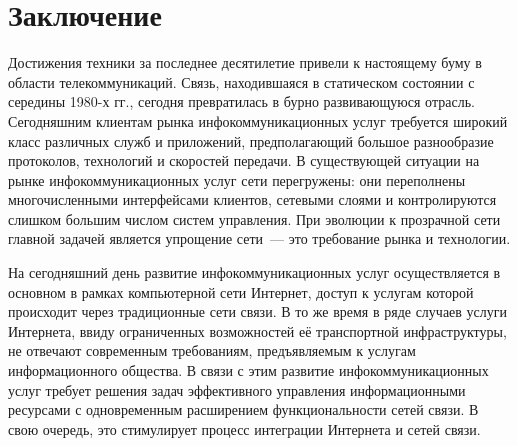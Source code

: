 
\chapter*{Заключение}
\label{cha:end}
\iftexht
\else
\fi    

Достижения техники за последнее десятилетие привели к настоящему буму
в области телекоммуникаций. Связь, находившаяся в статическом состоянии
с середины 1980-х гг., сегодня превратилась в бурно
развивающуюся отрасль.  Сегодняшним клиентам рынка
инфокоммуникационных услуг требуется широкий класс различных служб и
приложений, предполагающий большое разнообразие протоколов, технологий
и скоростей передачи. В существующей ситуации на рынке
инфокоммуникационных услуг сети перегружены: они переполнены
многочисленными интерфейсами клиентов, сетевыми слоями и
контролируются слишком большим числом систем управления. При эволюции
к прозрачной сети главной задачей является упрощение сети~--- это
требование рынка и технологии.

На сегодняшний день развитие инфокоммуникационных услуг
осуществляется в основном в рамках компьютерной сети Интернет,
доступ к услугам которой происходит через традиционные сети связи. В
то же время в ряде случаев услуги Интернета, ввиду ограниченных
возможностей её транспортной инфраструктуры, не отвечают современным
требованиям, предъявляемым к услугам информационного общества. В связи
с этим развитие инфокоммуникационных услуг требует решения задач
эффективного управления информационными ресурсами с одновременным
расширением функциональности сетей связи. В свою очередь, это
стимулирует процесс интеграции Интернета и сетей связи.




